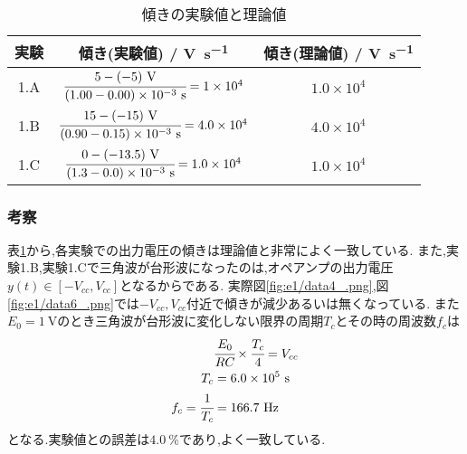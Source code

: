 \begin{table}[h]
  \caption{傾きの実験値と理論値}
  \label{tab:c1_exth}
  \centering
  \begin{tabular}{ccc}
    \hline
    実験&傾き(実験値) / \si{\volt.\second^{-1}}&傾き(理論値) / \si{\volt.\second^{-1}}\\
    \hline \hline
    1.A&$\cfrac{5-(-5)~\si{\volt}}{(1.00-0.00)\times10^{-3}~\si{\second}}=1\times10^4$&$1.0\times10^4$\\
    1.B&$\cfrac{15-(-15)~\si{\volt}}{(0.90-0.15)\times10^{-3}~\si{\second}}=4.0\times10^4$&$4.0\times10^4$\\
    1.C&$\cfrac{0-(-13.5)~\si{\volt}}{(1.3-0.0)\times10^{-3}~\si{\second}}=1.0\times10^4$&$1.0\times10^4$\\
    \hline
  \end{tabular}
\end{table}
\subsubsection{考察}
表\ref{tab:c1_exth}から,各実験での出力電圧の傾きは理論値と非常によく一致している.
また,実験1.B,実験1.Cで三角波が台形波になったのは,オペアンプの出力電圧$y(t)\in[-V_{cc},V_{cc}]$となるからである.
実際図\ref{fig:e1/data4_.png},図\ref{fig:e1/data6_.png}では$-V_{cc},V_{cc}$付近で傾きが減少あるいは無くなっている.
また$E_0=1~\si{\volt}$のとき三角波が台形波に変化しない限界の周期$T_c$とその時の周波数$f_c$は
\begin{align}
  &\cfrac{E_0}{RC}\times\cfrac{T_c}{4}=V_{cc}\\
  T_c&=6.0\times10^5~\si{\second}\\
  f_c=\cfrac{1}{T_c}&=166.7~\si{\hertz}
\end{align}
となる.実験値との誤差は$4.0~\%$であり,よく一致している.
